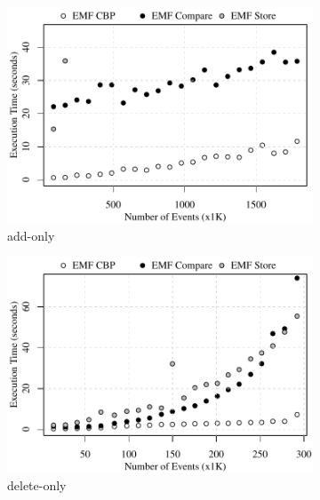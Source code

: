 \begin{figure}[ht]
  \centering
  \begin{subfigure}[t]{0.490\linewidth}
    \includegraphics[width=\linewidth]{add-conflict-time-events}
    \caption{add-only}
    \label{fig:add-conflict-time-events}
  \end{subfigure}
  \hfill
  \begin{subfigure}[t]{0.490\linewidth}
    \includegraphics[width=\linewidth]{delete-conflict-time-events}
    \caption{delete-only}
    \label{fig:delete-conflict-time-events}
  \end{subfigure}
  \\
  \begin{subfigure}[t]{0.490\linewidth}

\end{subfigure}
\end{figure}
